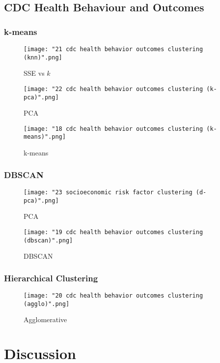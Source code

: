 \documentclass{article}
\begin{document}
		\subsection{CDC Health Behaviour and Outcomes}
			\subsubsection{k-means}
				\begin{figure}[h]
					\centering
					\caption{SSE vs $k$}
					\texttt{[image: "21 cdc health behavior outcomes clustering (knn)".png]}
					\label{fig:combinedKnn}
				\end{figure}
				\begin{figure}[h]
					\centering
					\caption{PCA}
					\texttt{[image: "22 cdc health behavior outcomes clustering (k-pca)".png]}
					\label{fig:combinedKpca}
				\end{figure}
				\begin{figure}[h]
					\centering
					\caption{k-means}
					\texttt{[image: "18 cdc health behavior outcomes clustering (k-means)".png]}
					\label{fig:combinedKmeans}
				\end{figure}
			\subsubsection{DBSCAN}
				\begin{figure}[h]
					\centering
					\caption{PCA}
					\texttt{[image: "23 socioeconomic risk factor clustering (d-pca)".png]}
					\label{fig:combinedDpca}
				\end{figure}
				\begin{figure}[h]
					\centering
					\caption{DBSCAN}
					\texttt{[image: "19 cdc health behavior outcomes clustering (dbscan)".png]}
					\label{fig:combinedDbscan}
				\end{figure}
			\subsubsection{Hierarchical Clustering}
				\begin{figure}[h]
					\centering
					\caption{Agglomerative}
					\texttt{[image: "20 cdc health behavior outcomes clustering (agglo)".png]}
					\label{fig:combinedAgglo}
				\end{figure}
	\section{Discussion}
	
	
\end{document}
